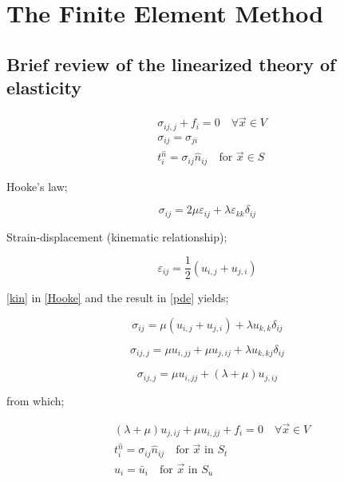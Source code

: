 \chapter{The Finite Element Method}

\section{Brief review of the linearized theory of elasticity}


\begin{equation} \label{pde}
\begin{split}
&{\sigma _{ij,j}} + {f_i} = 0 \quad \text{$\forall \vec x \in V$}\\
 &\sigma _{ij}=\sigma _{ji}\\
& t_i^{\hat n} = {\sigma _{ij}}{\hat n_{ij}} \quad \text{for $\vec x \in S$}
\end{split}
\end{equation}

Hooke's law;

\begin{equation} \label{Hooke}
{\sigma _{ij}} = 2\mu {\varepsilon _{ij}} + \lambda {\varepsilon _{kk}}{\delta _{ij}}
\end{equation}

Strain-displacement (kinematic relationship);

\begin{equation} \label{kin}
{\varepsilon _{ij}} = \frac{1}{2}\left( {{u_{i,j}} + {u_{j,i}}} \right)
\end{equation}

\cref{kin} in \cref{Hooke} and the result in \cref{pde} yields;

\[{\sigma _{ij}} = \mu \left( {{u_{i,j}} + {u_{j,i}}} \right) + \lambda {u_{k,k}}{\delta _{ij}}\]

\[{\sigma _{ij,j}} = \mu {u_{i,jj}} + \mu {u_{j,ij}} + \lambda {u_{k,kj}}{\delta _{ij}}\]

\[{\sigma _{ij,j}} = \mu {u_{i,jj}} + \left( {\lambda  + \mu } \right){u_{j,ij}}\]

from which;

\begin{equation} \label{navier}
\begin{split}
&\left( {\lambda  + \mu } \right){u_{j,ij}} + \mu {u_{i,jj}} + {f_i} = 0 \quad \text{$\forall \vec x \in V$} \\
&t_i^{\hat n} = {\sigma _{ij}}{\hat n_{ij}} \quad \text{for $\vec x$ in $S_t$}\\
& {u_i} = {{\bar u}_i} \quad \text{for $\vec x$ in $S_u$}
\end{split}
\end{equation}

